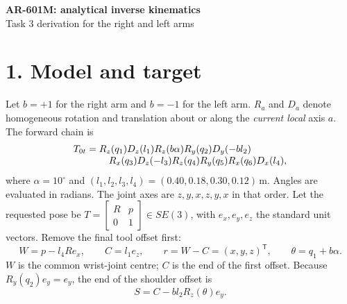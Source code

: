 \documentclass[10pt,a4paper]{article}
\begin{document}
\begin{center}
  {\Large\bfseries AR-601M: analytical inverse kinematics}\\[3pt]
  Task 3 derivation for the right and left arms
\end{center}

\section*{1. Model and target}
Let $b=+1$ for the right arm and $b=-1$ for the left arm. $R_a$ and $D_a$
denote homogeneous rotation and translation about or along the \emph{current
local} axis $a$. The forward chain is
\begin{align}
T_{0t}={}&R_z(q_1)D_z(l_1)R_z(b\alpha)R_y(q_2)D_y(-b l_2)
\notag\\[-3pt]
&\quad R_x(q_3)D_z(-l_3)R_z(q_4)R_y(q_5)R_x(q_6)D_x(l_4),
\label{eq:chain}
\end{align}
where $\alpha=10^\circ$ and $(l_1,l_2,l_3,l_4)=(0.40,0.18,0.30,0.12)$\,m.
Angles are evaluated in radians. The joint axes are $z,y,x,z,y,x$ in that
order. Let the requested pose be
$T=\begin{bmatrix}R&p\\0&1\end{bmatrix}\in SE(3)$, with $e_x,e_y,e_z$ the
standard unit vectors. Remove the final tool offset first:
\begin{equation}
W=p-l_4Re_x,\qquad C=l_1e_z,\qquad r=W-C=(x,y,z)^\mathsf{T},
\qquad \theta=q_1+b\alpha .
\label{eq:wrist}
\end{equation}
$W$ is the common wrist-joint centre; $C$ is the end of the first offset.
Because $R_y(q_2)e_y=e_y$, the end of the shoulder offset is
\begin{equation}
S=C-b l_2R_z(\theta)e_y.
\label{eq:shoulder}
\end{equation}
\end{document}
